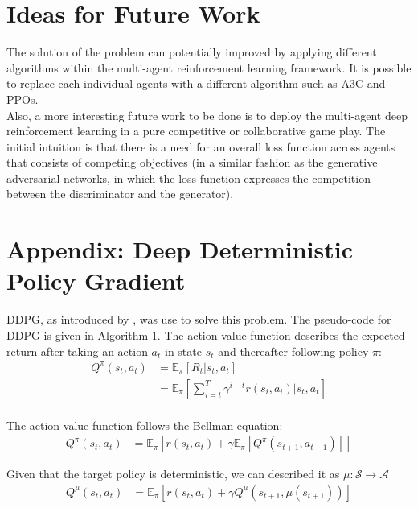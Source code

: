 \documentclass[12pt,twoside]{article}
\begin{document}
\section{Ideas for Future Work}
The solution of the problem can potentially improved by applying different algorithms within the multi-agent reinforcement learning framework. It is possible to replace each individual agents with a different algorithm such as A3C and PPOs.\\

Also, a more interesting future work to be done is to deploy the multi-agent deep reinforcement learning in a pure competitive or collaborative game play. The initial intuition is that there is a need for an overall loss function across agents that consists of competing objectives (in a similar fashion as the generative adversarial networks, in which the loss function expresses the competition between the discriminator and the generator).


\section*{Appendix: Deep Deterministic Policy Gradient} \label{appendix}
DDPG, as introduced by \cite{lillicrap2015continuous}, was use to solve this problem. The pseudo-code for DDPG is given in Algorithm 1. The action-value function describes the expected return after taking an action $a_t$ in state $s_t$ and thereafter following policy $\pi$:
\begin{align*}
	Q^\pi(s_t,a_t)	& = \mathbb{E}_{\pi}\left[R_t \vert s_t, a_t\right]\\
						& = \mathbb{E}_{\pi}\left[\sum_{i=t}^T \gamma^{i-t}r(s_i,a_i)\vert s_t, a_t\right]\\
\end{align*}

The action-value function follows the Bellman equation:
\begin{align*}
	Q^\pi(s_t,a_t) &=  \mathbb{E}_\pi\left[r(s_t,a_t) + \gamma \mathbb{E}_\pi\left[Q^\pi(s_{t+1}, a_{t+1})\right] \right]
\end{align*}

Given that the target policy is deterministic, we can described it as $\mu: \mathcal{S} \rightarrow \mathcal{A}$
\begin{align*}
	Q^\mu(s_t,a_t) &=  \mathbb{E}_\pi\left[r(s_t,a_t) + \gamma Q^\mu(s_{t+1}, \mu(s_{t+1})) \right]
\end{align*}
\end{document}
